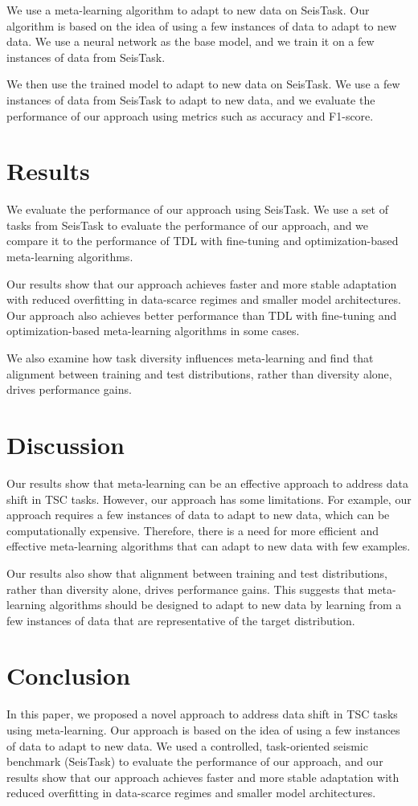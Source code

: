 \documentclass{article}
\begin{document}
We use a meta-learning algorithm to adapt to new data on SeisTask. Our algorithm is based on the idea of using a few instances of data to adapt to new data. We use a neural network as the base model, and we train it on a few instances of data from SeisTask.

We then use the trained model to adapt to new data on SeisTask. We use a few instances of data from SeisTask to adapt to new data, and we evaluate the performance of our approach using metrics such as accuracy and F1-score.

\section{Results}
We evaluate the performance of our approach using SeisTask. We use a set of tasks from SeisTask to evaluate the performance of our approach, and we compare it to the performance of TDL with fine-tuning and optimization-based meta-learning algorithms.

Our results show that our approach achieves faster and more stable adaptation with reduced overfitting in data-scarce regimes and smaller model architectures. Our approach also achieves better performance than TDL with fine-tuning and optimization-based meta-learning algorithms in some cases.

We also examine how task diversity influences meta-learning and find that alignment between training and test distributions, rather than diversity alone, drives performance gains.

\section{Discussion}
Our results show that meta-learning can be an effective approach to address data shift in TSC tasks. However, our approach has some limitations. For example, our approach requires a few instances of data to adapt to new data, which can be computationally expensive. Therefore, there is a need for more efficient and effective meta-learning algorithms that can adapt to new data with few examples.

Our results also show that alignment between training and test distributions, rather than diversity alone, drives performance gains. This suggests that meta-learning algorithms should be designed to adapt to new data by learning from a few instances of data that are representative of the target distribution.

\section{Conclusion}
In this paper, we proposed a novel approach to address data shift in TSC tasks using meta-learning. Our approach is based on the idea of using a few instances of data to adapt to new data. We used a controlled, task-oriented seismic benchmark (SeisTask) to evaluate the performance of our approach, and our results show that our approach achieves faster and more stable adaptation with reduced overfitting in data-scarce regimes and smaller model architectures.
\end{document}
